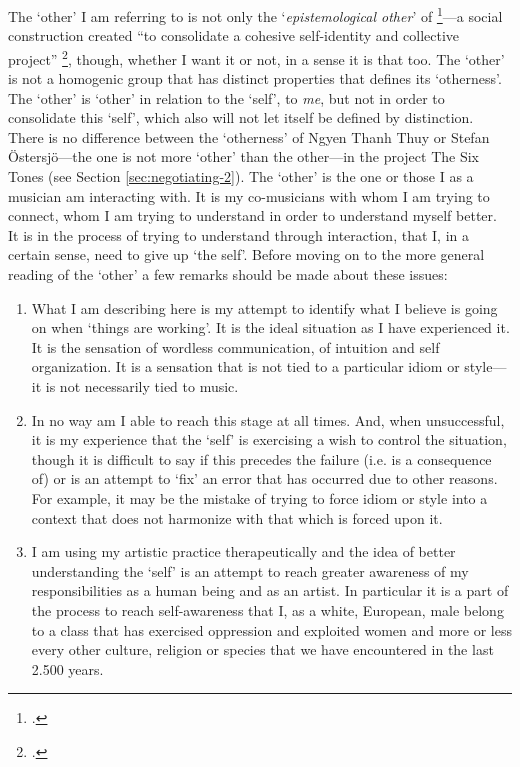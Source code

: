 The `other' I am referring to is not only the `\emph{epistemological other}' of \footcite{somers94}---a social construction created ``to consolidate a cohesive self-identity and collective project'' \footcite[As cited in][]{lewis-1}, though, whether I want it or not, in a sense it is that too. The `other' is not a homogenic group that has distinct properties that defines its `otherness'. The `other' is `other' in relation to the `self', to \emph{me}, but not in order to consolidate this `self', which also will not let itself be defined by distinction.  There is no difference between the `otherness' of Ngyen Thanh Thuy or Stefan \"{O}stersj\"{o}---the one is not more `other' than the other---in the project The Six Tones (see Section \ref{sec:negotiating-2}). The `other' is the one or those I as a musician am interacting with. It is my co-musicians with whom I am trying to connect, whom I am trying to understand in order to understand myself better. It is in the process of trying to understand through interaction, that I, in a certain sense, need to give up `the self'. Before moving on to the more general reading of the `other' a few remarks should be made about these issues:
\begin{enumerate}
\item What I am describing here is my attempt to identify what I believe is going on when `things are working'. It is the ideal situation as I have experienced it. It is the sensation of wordless communication, of intuition and self organization. It is a sensation that is not tied to a particular idiom or style---it is not necessarily tied to music.
%
\item In no way am I able to reach this stage at all times. And, when unsuccessful, it is my experience that the `self' is exercising a wish to control the situation, though it is difficult to say if this precedes the failure (i.e. is a consequence of) or is an attempt to `fix' an error that has occurred due to other reasons. For example, it may be the mistake of trying to force idiom or style into a context that does not harmonize with that which is forced upon it.
%
\item I am using my artistic practice therapeutically and the idea of better understanding the `self' is an attempt to reach greater awareness of my responsibilities as a human being and as an artist. In particular it is a part of the process to reach self-awareness that I, as a white, European, male belong to a class that has exercised oppression and exploited women and more or less every other culture, religion or species that we have encountered in the last 2.500 years.
\end{enumerate}

